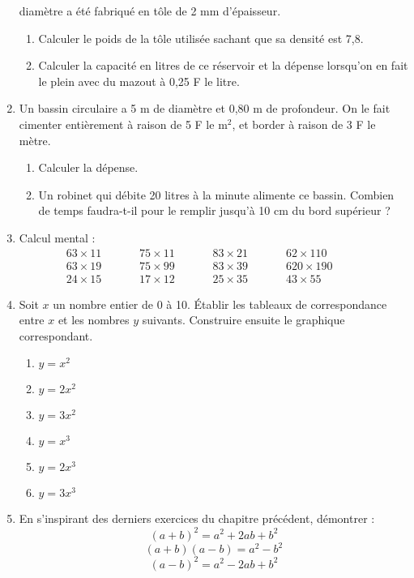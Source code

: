 \documentclass[12 pt]{extarticle}
\theoremstyle{plain}
\begin{document}
\begin{enumerate}
diamètre a été fabriqué en tôle de 2 mm d'épaisseur.
\begin{enumerate}
\item Calculer le poids de la tôle utilisée sachant que sa densité est 7,8. 
\item Calculer la capacité en litres de ce réservoir et la dépense lorsqu'on en fait le plein avec du 
mazout à 0,25 F le litre. 
\end{enumerate}
\item Un bassin circulaire a 5 m de diamètre et 0,80 m 
de profondeur. On le fait cimenter entièrement à raison de 5 F le m${}^2$, et border à raison de 3 F le
mètre.\begin{enumerate}
\item Calculer la dépense. 
\item Un robinet qui débite 20 litres à la minute 
alimente ce bassin. Combien de temps faudra-t-il pour le remplir jusqu'à 10 cm du bord supérieur ? 
\end{enumerate}
\item Calcul mental : \\
\[\begin{matrix}
63 \times 11 \phantom{meow}& 75 \times 11\phantom{meow} & 83 \times 21\phantom{meow} & 62 \times
 110\phantom{meow} \\
 63 \times 19 \phantom{meow}& 75 \times 99 \phantom{meow}& 83 \times 39 \phantom{meow}& 620 \times 190\phantom{meow}\\
 24 \times 15 \phantom{meow}& 17 \times 12 \phantom{meow}& 25 \times 35 \phantom{meow}& 43 \times 55 \phantom{meow}
 \end{matrix}\]
 \item Soit $x$ un nombre entier de 0 à 10. Établir les tableaux de correspondance entre $x$ et les nombres $y$ suivants. Construire ensuite le graphique 
 correspondant. \begin{enumerate}
 \item $y = x^2$
 \item $y = 2x^2$ 
 \item $y = 3x^2$ 
 \item $y = x^3$
 \item $y = 2x^3$
 \item $y = 3x^3$
 \end{enumerate}
 \item En s'inspirant des derniers exercices du 
 chapitre précédent, démontrer : 
 \[ (a + b)^2 = a^2 + 2ab + b^2\]
 \[ (a + b)(a - b) = a^2 - b^2\]
 \[ (a - b)^2 = a^2 - 2ab + b^2\]
\end{enumerate} 
 
\end{document}
